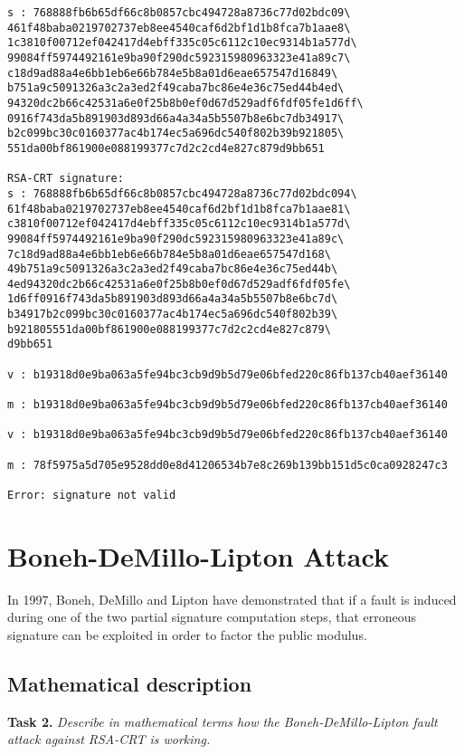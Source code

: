 \documentclass[a4paper]{report}
\begin{document}
\begin{verbatim}
s : 768888fb6b65df66c8b0857cbc494728a8736c77d02bdc09\
461f48baba0219702737eb8ee4540caf6d2bf1d1b8fca7b1aae8\
1c3810f00712ef042417d4ebff335c05c6112c10ec9314b1a577d\
99084ff5974492161e9ba90f290dc592315980963323e41a89c7\
c18d9ad88a4e6bb1eb6e66b784e5b8a01d6eae657547d16849\
b751a9c5091326a3c2a3ed2f49caba7bc86e4e36c75ed44b4ed\
94320dc2b66c42531a6e0f25b8b0ef0d67d529adf6fdf05fe1d6ff\
0916f743da5b891903d893d66a4a34a5b5507b8e6bc7db34917\
b2c099bc30c0160377ac4b174ec5a696dc540f802b39b921805\
551da00bf861900e088199377c7d2c2cd4e827c879d9bb651

RSA-CRT signature:
s : 768888fb6b65df66c8b0857cbc494728a8736c77d02bdc094\
61f48baba0219702737eb8ee4540caf6d2bf1d1b8fca7b1aae81\
c3810f00712ef042417d4ebff335c05c6112c10ec9314b1a577d\
99084ff5974492161e9ba90f290dc592315980963323e41a89c\
7c18d9ad88a4e6bb1eb6e66b784e5b8a01d6eae657547d168\
49b751a9c5091326a3c2a3ed2f49caba7bc86e4e36c75ed44b\
4ed94320dc2b66c42531a6e0f25b8b0ef0d67d529adf6fdf05fe\
1d6ff0916f743da5b891903d893d66a4a34a5b5507b8e6bc7d\
b34917b2c099bc30c0160377ac4b174ec5a696dc540f802b39\
b921805551da00bf861900e088199377c7d2c2cd4e827c879\
d9bb651

v : b19318d0e9ba063a5fe94bc3cb9d9b5d79e06bfed220c86fb137cb40aef36140

m : b19318d0e9ba063a5fe94bc3cb9d9b5d79e06bfed220c86fb137cb40aef36140

v : b19318d0e9ba063a5fe94bc3cb9d9b5d79e06bfed220c86fb137cb40aef36140

m : 78f5975a5d705e9528dd0e8d41206534b7e8c269b139bb151d5c0ca0928247c3

Error: signature not valid
\end{verbatim}


\chapter{Boneh-DeMillo-Lipton Attack}
In 1997, Boneh, DeMillo and Lipton have demonstrated that if a fault is induced during one of the two partial signature computation steps, that erroneous signature can be exploited in order to factor the public modulus.

\section{Mathematical description}
\textbf{Task 2.} \textit{Describe in mathematical terms how the Boneh-DeMillo-Lipton fault attack against RSA-CRT is working.}
\end{document}
